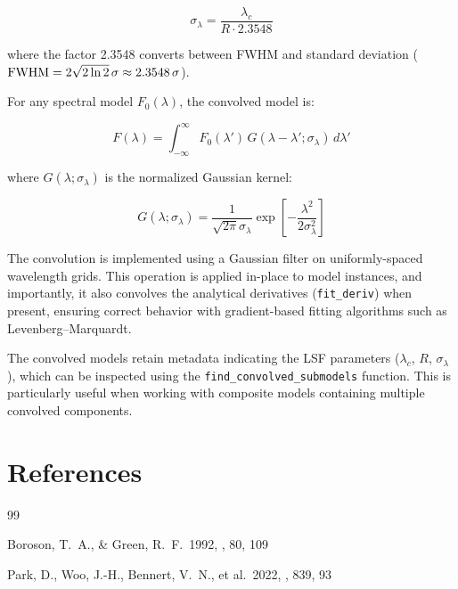 \documentclass[11pt]{article}
\begin{document}
\begin{equation}
\sigma_\lambda = \frac{\lambda_c}{R \cdot 2.3548}
\end{equation}

where the factor 2.3548 converts between FWHM and standard deviation (${\rm FWHM} = 2\sqrt{2\ln 2}\,\sigma \approx 2.3548\,\sigma$).

For any spectral model $F_0(\lambda)$, the convolved model is:

\begin{equation}
F(\lambda) = \int_{-\infty}^{\infty} F_0(\lambda') \, G(\lambda - \lambda'; \sigma_\lambda) \, d\lambda'
\end{equation}

where $G(\lambda; \sigma_\lambda)$ is the normalized Gaussian kernel:

\begin{equation}
G(\lambda; \sigma_\lambda) = \frac{1}{\sqrt{2\pi}\sigma_\lambda} \exp\left[-\frac{\lambda^2}{2\sigma_\lambda^2}\right]
\end{equation}

The convolution is implemented using a Gaussian filter on uniformly-spaced wavelength grids. This operation is applied in-place to model instances, and importantly, it also convolves the analytical derivatives (\texttt{fit\_deriv}) when present, ensuring correct behavior with gradient-based fitting algorithms such as Levenberg--Marquardt.

The convolved models retain metadata indicating the LSF parameters ($\lambda_c$, $R$, $\sigma_\lambda$), which can be inspected using the \texttt{find\_convolved\_submodels} function. This is particularly useful when working with composite models containing multiple convolved components.

\section{References}

\begin{thebibliography}{99}

Boroson, T.~A., \& Green, R.~F.\ 1992, \apjs, 80, 109

Park, D., Woo, J.-H., Bennert, V.~N., et al.\ 2022, \apj, 839, 93

\end{thebibliography}
\end{document}
